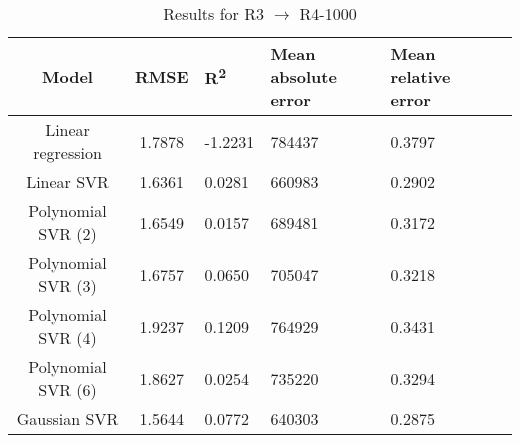\begin{table}[H]
\centering
\begin{adjustbox}{center}
\begin{tabular}{c | c M{1.2cm} M{2.5cm} M{2.5cm} M{1.8cm}}
Model & RMSE & R\textsuperscript{2} & Mean absolute error & Mean relative error \tabularnewline
\hline
Linear regression & 1.7878 & -1.2231 & 784437 & 0.3797 \\
Linear SVR & 1.6361 & 0.0281 & 660983 & 0.2902 \\
Polynomial SVR (2) & 1.6549 & 0.0157 & 689481 & 0.3172 \\
Polynomial SVR (3) & 1.6757 & 0.0650 & 705047 & 0.3218 \\
Polynomial SVR (4) & 1.9237 & 0.1209 & 764929 & 0.3431 \\
Polynomial SVR (6) & 1.8627 & 0.0254 & 735220 & 0.3294 \\
Gaussian SVR & 1.5644 & 0.0772 & 640303 & 0.2875 \\
\end{tabular}
\end{adjustbox}
\\
\caption{Results for R3 $\rightarrow$ R4-1000}
\label{tab:coreonly_linear_R3_R4_1000}
\end{table}
